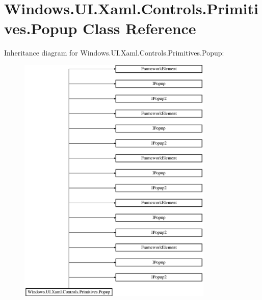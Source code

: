 \hypertarget{class_windows_1_1_u_i_1_1_xaml_1_1_controls_1_1_primitives_1_1_popup}{}\section{Windows.\+U\+I.\+Xaml.\+Controls.\+Primitives.\+Popup Class Reference}
\label{class_windows_1_1_u_i_1_1_xaml_1_1_controls_1_1_primitives_1_1_popup}
Inheritance diagram for Windows.\+U\+I.\+Xaml.\+Controls.\+Primitives.\+Popup\+:\begin{figure}[H]
\begin{center}
\leavevmode
\includegraphics[height=12.000000cm]{class_windows_1_1_u_i_1_1_xaml_1_1_controls_1_1_primitives_1_1_popup}
\end{center}
\end{figure}
